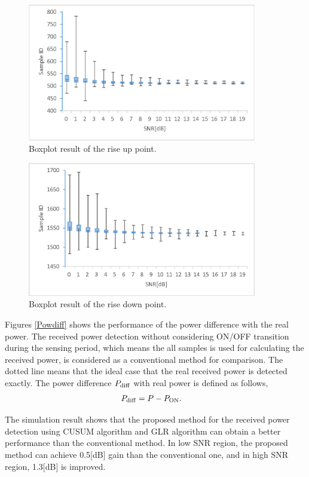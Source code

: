 \newpage

\begin{figure}[t]
\centering
\includegraphics[width=100mm]{transition_up.eps}
\caption{Boxplot result of the rise up point.}
\label{transition_up}
\end{figure}
\begin{figure}[t]
\centering
\includegraphics[width=100mm]{transition_down.eps}
\caption{Boxplot result of the rise down point.}
\label{transition_down}
\end{figure}

Figures \ref{Powdiff} shows the performance of the power difference with the real power. 
The received power detection without considering ON/OFF transition during the sensing period, which means the all samples is used for calculating the received power, is considered as a conventional method for comparison. The dotted line means that the ideal case that the real received power is detected exactly. The power difference $P_{\rm diff}$ with real power is defined as follows,
\begin{eqnarray}
P_{{\rm diff}} &= P-P_{{\rm ON}}.
\label{diff}
\end{eqnarray}

The simulation result shows that the proposed method for the received power detection using CUSUM algorithm and GLR algorithm can obtain a better performance than the conventional method. In low SNR region, the proposed method can achieve 0.5[dB] gain than the conventional one, and in high SNR region, 1.3[dB] is improved.

